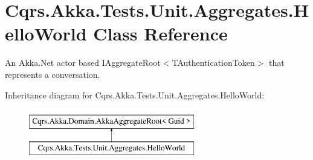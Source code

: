 \hypertarget{classCqrs_1_1Akka_1_1Tests_1_1Unit_1_1Aggregates_1_1HelloWorld}{}\section{Cqrs.\+Akka.\+Tests.\+Unit.\+Aggregates.\+Hello\+World Class Reference}
\label{classCqrs_1_1Akka_1_1Tests_1_1Unit_1_1Aggregates_1_1HelloWorld}


An Akka.\+Net actor based I\+Aggregate\+Root$<$\+T\+Authentication\+Token$>$ that represents a conversation.  


Inheritance diagram for Cqrs.\+Akka.\+Tests.\+Unit.\+Aggregates.\+Hello\+World\+:\begin{figure}[H]
\begin{center}
\leavevmode
\includegraphics[height=2.000000cm]{classCqrs_1_1Akka_1_1Tests_1_1Unit_1_1Aggregates_1_1HelloWorld}
\end{center}
\end{figure}
